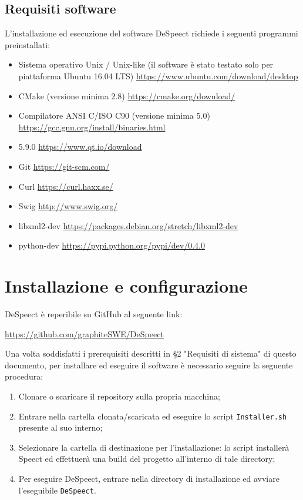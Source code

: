 \documentclass[openany,12pt,a4paper]{report}
\begin{document}
	\section{Requisiti software}
	
	L'installazione ed esecuzione del software DeSpeect richiede i seguenti programmi preinstallati:
	
	\begin{itemize}
		\item Sistema operativo Unix / Unix-like (il software è stato testato solo per piattaforma Ubuntu 16.04 LTS)
		\subitem \url{https://www.ubuntu.com/download/desktop}
		\item CMake (versione minima 2.8)
		\subitem \url{https://cmake.org/download/}
		\item Compilatore ANSI C/ISO C90  (versione minima 5.0)
		\subitem \url{https://gcc.gnu.org/install/binaries.html}
		\item {} 5.9.0
		\subitem \url{https://www.qt.io/download}
		\item Git
		\subitem \url{https://git-scm.com/} 
		\item Curl 
		\subitem \url{https://curl.haxx.se/}
		\item Swig 
		\subitem \url{http://www.swig.org/}
		\item libxml2-dev
		\subitem \url{https://packages.debian.org/stretch/libxml2-dev} 
		\item python-dev
		\subitem \url{https://pypi.python.org/pypi/dev/0.4.0}
	\end{itemize}
	
	 
	\chapter{Installazione e configurazione} 
	
	DeSpeect è reperibile su GitHub al seguente link:
	\begin{center}
		\url{https://github.com/graphiteSWE/DeSpeect}
	\end{center}
	
	\noindent Una volta soddisfatti i prerequisiti descritti in §2 "Requisiti di sistema" di questo documento, per installare ed eseguire il software è necessario seguire la seguente procedura:
	\begin{enumerate}
		\item Clonare o scaricare il repository sulla propria macchina;
		\item Entrare nella cartella clonata/scaricata ed eseguire lo script \verb|Installer.sh| presente al suo interno;
		\item Selezionare la cartella di destinazione per l'installazione: lo script installerà Speect ed effettuerà una build del progetto all'interno di tale directory;
		\item Per eseguire DeSpeect, entrare nella directory di installazione ed avviare l'eseguibile \verb|DeSpeect|.
	\end{enumerate}
	
\end{document}
